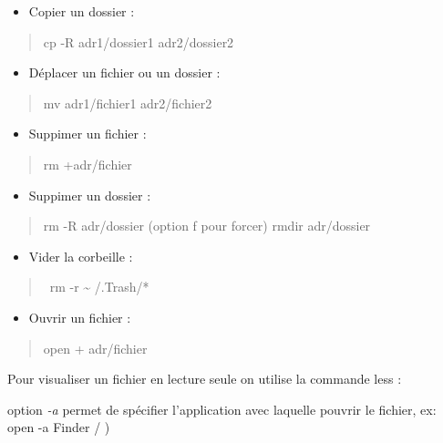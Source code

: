 \begin{itemize}
\tightlist
\item
  Copier un dossier :
\end{itemize}

\begin{quote}
cp -R adr1/dossier1 adr2/dossier2
\end{quote}

\begin{itemize}
\tightlist
\item
  Déplacer un fichier ou un dossier :
\end{itemize}

\begin{quote}
mv adr1/fichier1 adr2/fichier2
\end{quote}

\begin{itemize}
\tightlist
\item
  Suppimer un fichier :
\end{itemize}

\begin{quote}
rm +adr/fichier
\end{quote}

\begin{itemize}
\tightlist
\item
  Suppimer un dossier :
\end{itemize}

\begin{quote}
rm -R adr/dossier (option f pour forcer) rmdir adr/dossier
\end{quote}

\begin{itemize}
\tightlist
\item
  Vider la corbeille :
\end{itemize}

\begin{quote}
~rm -r \textasciitilde{} /.Trash/*
\end{quote}

\begin{itemize}
\tightlist
\item
  Ouvrir un fichier :
\end{itemize}

\begin{quote}
open + adr/fichier
\end{quote}

Pour visualiser un fichier en lecture seule on utilise la commande less
:

option \emph{-a} permet de spécifier l'application avec laquelle pouvrir
le fichier, ex: open -a Finder / )

